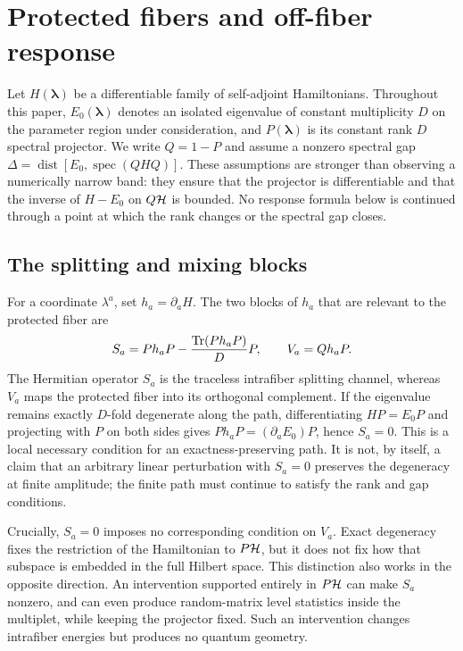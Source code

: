 \section{Protected fibers and off-fiber response}
\label{sec:protected-response}

Let $H(\boldsymbol\lambda)$ be a differentiable family of self-adjoint
Hamiltonians.  Throughout this paper, $E_0(\boldsymbol\lambda)$ denotes an
isolated eigenvalue of constant multiplicity $D$ on the parameter region under
consideration, and $P(\boldsymbol\lambda)$ is its constant rank $D$ spectral
projector.  We write
$Q=1-P$ and assume a nonzero spectral gap
$\Delta=\operatorname{dist}[E_0,\operatorname{spec}(QHQ)]$.  These assumptions
are stronger than observing a numerically narrow band: they ensure that the
projector is differentiable and that the inverse of $H-E_0$ on $Q\mathcal H$ is
bounded.  No response formula below is continued through a point at which the
rank changes or the spectral gap closes.

\subsection{The splitting and mixing blocks}

For a coordinate $\lambda^a$, set $h_a=\partial_aH$.  The two blocks of $h_a$
that are relevant to the protected fiber are
\begin{equation}
 S_a=Ph_aP-\frac{\operatorname{Tr}(Ph_aP)}{D}P,
 \qquad
 V_a=Qh_aP .
 \label{eq:splitting}
\end{equation}
The Hermitian operator $S_a$ is the traceless intrafiber splitting channel,
whereas $V_a$ maps the protected fiber into its orthogonal complement.  If the
eigenvalue remains exactly $D$-fold degenerate along the path, differentiating
$HP=E_0P$ and projecting with $P$ on both sides gives
$Ph_aP=(\partial_aE_0)P$, hence $S_a=0$.  This is a local necessary condition
for an exactness-preserving path.  It is not, by itself, a claim that an
arbitrary linear perturbation with $S_a=0$ preserves the degeneracy at finite
amplitude; the finite path must continue to satisfy the rank and gap
conditions.

Crucially, $S_a=0$ imposes no corresponding condition on $V_a$.  Exact
degeneracy fixes the restriction of the Hamiltonian to $P\mathcal H$, but it does not
fix how that subspace is embedded in the full Hilbert space.  This distinction
also works in the opposite direction.  An intervention supported entirely in
$P\mathcal H$ can make $S_a$ nonzero, and can even produce random-matrix level
statistics inside the multiplet, while keeping the projector fixed.  Such an
intervention changes intrafiber energies but produces no quantum geometry.

